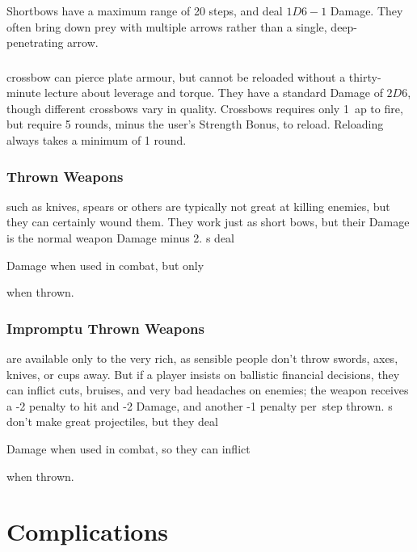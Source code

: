 \begin{multicols}{2}
Shortbows have a maximum range of 20 steps, and deal $1D6-1$ Damage.
They often bring down prey with multiple arrows rather than a single, deep-penetrating arrow.

\subsubsection{}
\glsdesc{crossbow}
\label{crossbow}
can pierce plate armour, but cannot be reloaded without a thirty-minute lecture about leverage and torque.
They have a standard Damage of $2D6$, though different crossbows vary in quality.
Crossbows requires only 1~\gls{ap} to fire, but require 5 \glspl{round}, minus the user's Strength Bonus, to reload.
Reloading always takes a minimum of 1 \gls{round}.

\subsubsection{Thrown Weapons}
such as knives, spears or others are typically not great at killing enemies, but they can certainly wound them.
They work just as short bows, but their Damage is the normal weapon Damage minus 2.
\javelin\weaponName s deal
\addtocounter{weaponDamage}{4}
 Damage
when used in combat, but only
\addtocounter{weaponDamage}{-2}%
 when thrown.

\subsubsection{Impromptu Thrown Weapons}
are available only to the very rich, as sensible people don't throw swords, axes, knives, or cups away.
But if a player insists on ballistic financial decisions, they can inflict cuts, bruises, and very bad headaches on enemies; the weapon receives a -2 penalty to hit and -2 Damage, and another -1 penalty per~\gls{step} thrown.
\longsword\weaponName s don't make great projectiles, but they deal
\addtocounter{weaponDamage}{4}
 Damage
when used in combat, so they can inflict
\addtocounter{weaponDamage}{-2}%
 when thrown.

\end{multicols}

\projectilesChart

\startcontents[Manoeuvres]

\section{Complications}

